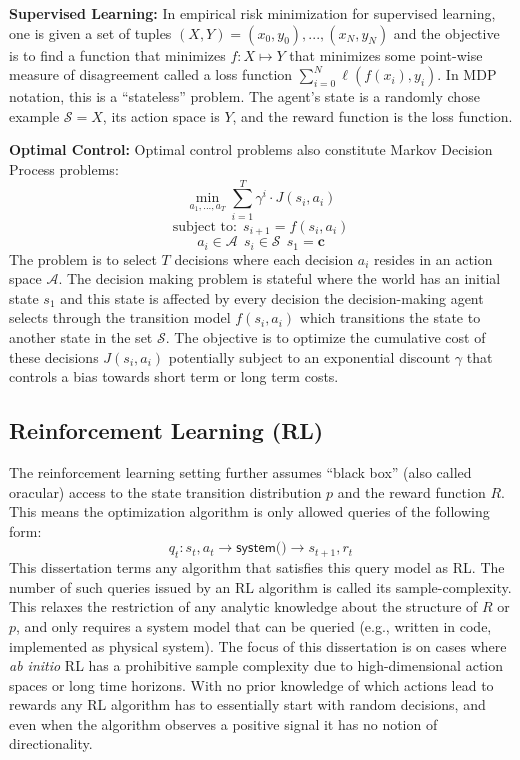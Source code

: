 \vspace{0.5em}\noindent \textbf{Supervised Learning: } In empirical risk minimization for supervised learning, one is given a set of tuples $(X,Y) = {(x_0,y_0),...,(x_N,y_N)}$ and the objective is to find a function that minimizes $f: X \mapsto Y$ that minimizes some point-wise measure of disagreement called a loss function $\sum_{i=0}^N \ell(f(x_i),y_i)$. In MDP notation, this is a ``stateless'' problem.  The agent's state is a randomly chose example $\mathcal{S} = X$, its action space is $Y$, and the reward function is the loss function.

\vspace{0.5em}\noindent \textbf{Optimal Control: } Optimal control problems also constitute Markov Decision Process problems:
\[
\min_{a_1,...,a_T} \sum_{i=1}^T \gamma^i \cdot J(s_i, a_i) 
\]
\[
\text{subject to:} ~~ s_{i+1} = f(s_i, a_i)
\]
\[
a_i \in \mathcal{A} ~~ s_i \in \mathcal{S} ~~ s_1 = \mathbf{c}
\]
The problem is to select $T$ decisions where each decision $a_i$ resides in an action space $\mathcal{A}$. The decision making problem is stateful where the world has an initial state $s_1$ and this state is affected by every decision the decision-making agent selects through the transition model $f(s_i, a_i)$ which transitions the state to another state in the set $\mathcal{S}$. The objective is to optimize the cumulative cost of these decisions $J(s_i,a_i)$ potentially subject to an exponential discount $\gamma$ that controls a bias towards short term or long term costs.

\subsection{Reinforcement Learning (RL)}
The reinforcement learning setting further assumes ``black box'' (also called oracular) access to the state transition distribution $p$ and the reward function $R$.
This means the optimization algorithm is only allowed queries of the following form:
\[
q_t: s_t, a_t \rightarrow \textsf{system()} \rightarrow s_{t+1}, r_{t}
\]
This dissertation terms any algorithm that satisfies this query model as RL.
The number of such queries issued by an RL algorithm is called its sample-complexity. 
This relaxes the restriction of any analytic knowledge about the structure of $R$ or $p$, and only requires a system model that can be queried (e.g., written in code, implemented as physical system).
The focus of this dissertation is on cases where \emph{ab initio} RL has a prohibitive sample complexity due to high-dimensional action spaces or long time horizons.
 With no prior knowledge of which actions lead to rewards any RL algorithm has to essentially start with random decisions, and even when the algorithm observes a positive signal it has no notion of directionality. 

